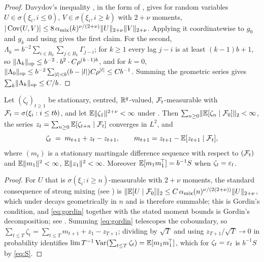 \begin{proof}
Davydov's inequality \citep{davydov1968convergence}, in the form of
\citet[Cor.~1.1]{rio1993covariance}, gives for random variables $U\in\sigma(\xi_i,i\le0)$,
$V\in\sigma(\xi_i,i\ge k)$ with $2+\nu$ moments,
$|\operatorname{Cov}(U,V)|\le 8\,\alpha_{\mathrm{mix}}(k)^{\nu/(2+\nu)}\lVert U \rVert_{2+\nu}\lVert V \rVert_{2+\nu}$.
Applying it coordinatewise to $g_0$ and $g_k$ and using  gives the first
claim. For the second, $\Lambda_k=b^{-2}\sum_{i\in B_0}\sum_{j\in B_k}\Gamma_{j-i}$; for
$k\ge1$ every lag $j-i$ is at least $(k-1)b+1$, so
$\lVert \Lambda_k \rVert_{\mathrm{op}}\le b^{-2}\cdot b^2\cdot C\rho^{(k-1)b}$, and for $k=0$,
$\lVert \Lambda_0 \rVert_{\mathrm{op}}\le b^{-2}\sum_{|l|<b}(b-|l|)C\rho^{|l|}\le Cb^{-1}$.
Summing the geometric series gives $\sum_k\lVert \Lambda_k \rVert_{\mathrm{op}}\le C/b$.
\end{proof}

\begin{lemma}
\label{lem:gordin}
Let $(\zeta_t)_{t\ge1}$ be stationary, centred, $\mathbb{R}^{q}$-valued, $\mathcal{F}_t$-measurable with
$\mathcal{F}_t=\sigma(\xi_i:i\le tb)$, and let $\mathbb{E}\lVert \zeta_1 \rVert^{2+\nu}<\infty$ under
. Then $\sum_{n\ge0}\lVert \mathbb{E}[\zeta_{n}\mid\mathcal{F}_0] \rVert_{2}<\infty$, the series
$z_t=\sum_{n\ge0}\mathbb{E}[\zeta_{t+n}\mid\mathcal{F}_t]$ converges in $L^2$, and
\begin{equation}
\zeta_t \;=\; m_{t+1}+z_t-z_{t+1},
\qquad m_{t+1}=z_{t+1}-\mathbb{E}[z_{t+1}\mid\mathcal{F}_t],
\label{eq:gordin}
\end{equation}
where $(m_t)$ is a stationary martingale difference sequence with respect to $(\mathcal{F}_t)$ and
$\mathbb{E}\lVert m_1 \rVert^2<\infty$, $\mathbb{E}\lVert z_1 \rVert^2<\infty$. Moreover
$\mathbb{E}[m_1m_1^{\!\top}]=b^{-1}S$ when $\zeta_t=\varepsilon_t$.
\end{lemma}

\begin{proof}
For $U$ that is $\sigma(\xi_i:i\ge n)$-measurable with $2+\nu$ moments, the standard
consequence of strong mixing (see \citealt[Ch.~1]{rio2017asymptotic}) is
$\lVert \mathbb{E}[U\mid\mathcal{F}_0] \rVert_2\le C\,\alpha_{\mathrm{mix}}(n)^{\nu/(2(2+\nu))}\lVert U \rVert_{2+\nu}$,
which under  decays geometrically in $n$ and is therefore summable; this is
Gordin's condition, and \eqref{eq:gordin} together with the stated moment bounds is Gordin's
decomposition; see \citet[Ch.~5]{hall1980martingale}. Summing \eqref{eq:gordin} telescopes
the coboundary, so $\sum_{t\le T}\zeta_t=\sum_{t\le T}m_{t+1}+z_1-z_{T+1}$; dividing by
$\sqrt T$ and using $z_{T+1}/\sqrt T\to0$ in probability identifies
$\lim T^{-1}\operatorname{Var}(\sum_{t\le T}\zeta_t)=\mathbb{E}[m_1m_1^{\!\top}]$, which for $\zeta_t=\varepsilon_t$ is
$b^{-1}S$ by \eqref{eq:S}.
\end{proof}

